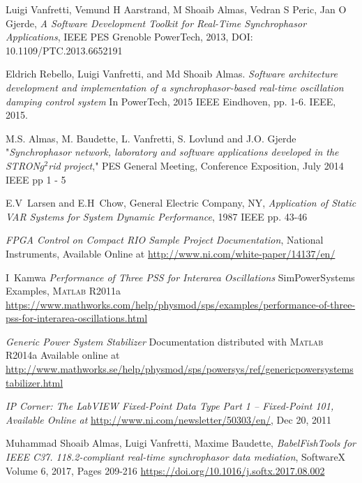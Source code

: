 \documentclass[journal]{IEEEtran}
\begin{document}
\begin{thebibliography}{1}
 Luigi Vanfretti, Vemund H Aarstrand, M Shoaib Almas, Vedran S Peric, Jan O Gjerde, \emph{A Software Development Toolkit for Real-Time Synchrophasor Applications},  IEEE PES Grenoble PowerTech, 2013, DOI: 10.1109/PTC.2013.6652191

Eldrich Rebello, Luigi Vanfretti, and Md Shoaib Almas. \emph{Software architecture development and implementation of a synchrophasor-based real-time oscillation damping control system} In PowerTech, 2015 IEEE Eindhoven, pp. 1-6. IEEE, 2015.

 M.S. Almas, M. Baudette, L. Vanfretti, S. Lovlund and J.O. Gjerde "\emph{Synchrophasor network, laboratory and software applications developed in the STRON$g^{2}$rid project}," PES General Meeting, Conference Exposition, July 2014 IEEE pp 1 - 5

 E.V~Larsen and E.H~Chow, General Electric Company, NY, \emph{Application of Static VAR Systems for System Dynamic Performance}, 1987 IEEE pp. 43-46






  

 \emph{FPGA Control on Compact RIO Sample Project Documentation}, National Instruments, Available Online at \url{http://www.ni.com/white-paper/14137/en/}


 I~Kamwa \emph{Performance of Three PSS for Interarea Oscillations} SimPowerSystems Examples, \textsc{Matlab} R2011a \url{https://www.mathworks.com/help/physmod/sps/examples/performance-of-three-pss-for-interarea-oscillations.html}

 \emph{Generic Power System Stabilizer} Documentation distributed with \textsc{Matlab} R2014a Available online at \url{http://www.mathworks.se/help/physmod/sps/powersys/ref/genericpowersystemstabilizer.html}

 \emph{IP Corner: The LabVIEW Fixed-Point Data Type Part 1 – Fixed-Point 101, Available Online at} \url{http://www.ni.com/newsletter/50303/en/}, Dec 20, 2011 



 Muhammad Shoaib Almas, Luigi Vanfretti, Maxime Baudette, \emph{BabelFish\textendash Tools for IEEE C37. 118.2-compliant real-time synchrophasor data mediation}, SoftwareX Volume 6, 2017, Pages 209-216 \url{https://doi.org/10.1016/j.softx.2017.08.002}


\end{thebibliography}
\end{document}
